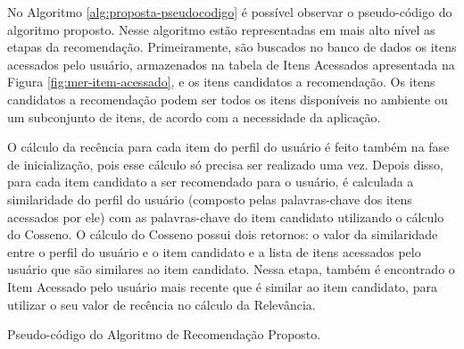 No Algoritmo \ref{alg:proposta-pseudocodigo} é possível observar o pseudo-código do algoritmo proposto. Nesse algoritmo
estão representadas em mais alto nível as etapas da recomendação. Primeiramente, são buscados no banco de dados os itens acessados
pelo usuário, armazenados na tabela de Itens Acessados apresentada na Figura \ref{fig:mer-item-acessado}, e os itens candidatos a recomendação. Os itens candidatos a
recomendação podem ser todos os itens disponíveis no ambiente ou um subconjunto de itens, de acordo com a necessidade da aplicação.

O cálculo da recência para cada item do perfil do usuário é feito também na fase de inicialização, pois esse cálculo só
precisa ser realizado uma vez. Depois disso, para cada item candidato a ser recomendado para o usuário, é calculada a
similaridade do perfil do usuário (composto pelas palavras-chave dos itens acessados por ele) com as palavras-chave do item
candidato utilizando o cálculo do Cosseno. O cálculo do Cosseno possui dois retornos: o valor da similaridade entre o perfil do usuário
e o item candidato e a lista de itens acessados pelo usuário que são similares ao item candidato. Nessa etapa, também é
encontrado o Item Acessado pelo usuário mais recente que é similar ao item candidato, para utilizar o seu valor de recência no cálculo da Relevância.

\begin{algorithm}
  \caption{Pseudo-código do Algoritmo de Recomendação Proposto. \label{alg:proposta-pseudocodigo}}


\end{algorithm}

